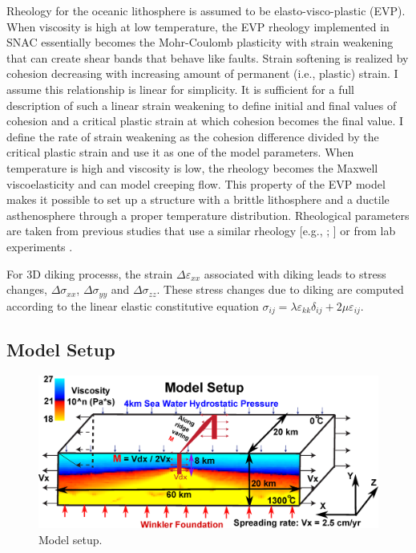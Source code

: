 Rheology for the oceanic lithosphere is assumed to be elasto-visco-plastic (EVP). When viscosity is high at low temperature, the EVP rheology implemented in SNAC essentially becomes the Mohr-Coulomb plasticity with strain weakening that can create shear bands that behave like faults. Strain softening is realized by cohesion decreasing with increasing amount of permanent (i.e., plastic) strain. I assume this relationship is linear for simplicity. It is sufficient for a full description of such a linear strain weakening to define initial and final values of cohesion and a critical plastic strain at which cohesion becomes the final value. I define the rate of strain weakening as the cohesion difference divided by the critical plastic strain and use it as one of the model parameters. When temperature is high and viscosity is low, the rheology becomes the Maxwell viscoelasticity and can model creeping flow. This property of the EVP model makes it possible to set up a structure with a brittle lithosphere and a ductile asthenosphere through a proper temperature distribution. Rheological parameters are taken from previous studies that use a similar rheology [e.g., \citealp{Buck2005}; \citealp{Tucholke2008}] or from lab experiments \citep[e.g.,][]{Kirby1987}. 

For 3D diking processs, the strain $\Delta\varepsilon_{xx}$ associated with diking leads to stress changes, $\Delta\sigma_{xx}$, $\Delta\sigma_{yy}$ and $\Delta\sigma_{zz}$. These stress changes due to diking are computed according to the linear elastic constitutive equation $\sigma_{ij}=\lambda\varepsilon_{kk}\delta_{ij}+2\mu\varepsilon_{ij}$.

\subsection{Model Setup}

\begin{figure}[h]
 \centering
  \includegraphics[width=1.0\textwidth] {./Figures/fig_Methods_Model_Setup.eps}
 \caption{Model setup.}
 \label{fig_Methods8_1}
\end{figure}

